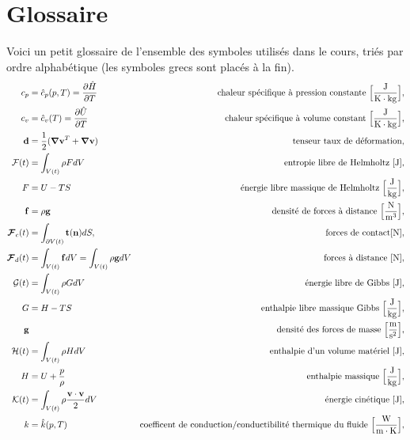 
\chapter{Glossaire}
  Voici un petit glossaire de l'ensemble des symboles utilisés dans le cours, triés par ordre alphabétique (les symboles grecs sont placés à la fin).
  \begingroup
    \allowdisplaybreaks
    \begin{align*}
      c_p &= \hat{c}_p(p,T) = \pdv{\hat{H}}{T} & \textrm{chaleur spécifique à pression constante } \Big[\si{\frac{J}{K \cdot kg}}\Big],\\
      c_v &= \hat{c}_v (T) = \pdv{\hat{U}}{T} & \textrm{chaleur spécifique à volume constant } \Big[\si{\frac{J}{K \cdot kg}}\Big],\\
      \vb{d} &= \recip{2}(\grad\vb{v}^T + \grad\vb{v}) & \textrm{tenseur taux de déformation},\\
      \mathcal{F}(t) &= \int_{V(t)} \rho F dV & \textrm{entropie libre de Helmholtz } [\si{J}],\\
      F &= U - TS & \textrm{énergie libre massique de Helmholtz } \Big[\si{\frac{J}{kg}}\Big],\\
      \vb{f} &= \rho \vb{g} & \textrm{densité de forces à distance } \Big[\si{\frac{N}{m^3}}\Big], \\
      \bs{\mathcal{F}}_c (t) &= \int_{\partial V(t)} \vb{t}(\vb{n}) dS, & \textrm{forces de contact} [\si{N}],\\
      \bs{\mathcal{F}}_d (t) &= \int_{V(t)} \vb{f} dV = \int_{V(t)} \rho \vb{g} dV & \textrm{forces à distance } [\si{N}],\\
      \mathcal{G}(t) &= \int_{V(t)} \rho G dV & \textrm{énergie libre de Gibbs } [\si{J}],\\
      G &= H -TS & \textrm{enthalpie libre massique Gibbs } \Big[\si{\frac{J}{kg}}\Big],\\
      \vb{g} & & \textrm {densité des forces de masse } \Big[\si{\frac{m}{s^2}}\Big],\\
      \mathcal{H}(t) &= \int_{V(t)} \rho H dV & \textrm{enthalpie d'un volume matériel } [\si{J}],\\
      H &= U + \frac{p}{\rho} & \textrm{enthalpie massique } \Big[\si{\frac{J}{kg}}\Big],\\
      \mathcal{K}(t) &= \int_{V(t)} \rho \frac{\vb{v}\cdot\vb{v}}{2} dV & \textrm{énergie cinétique } [\si{J}],\\
      k &= \hat{k}(p,T) & \textrm{coefficent de conduction/conductibilité thermique du fluide } \Big[\si{\frac{W}{m\cdot K}} \Big],\\

\end{align*}
